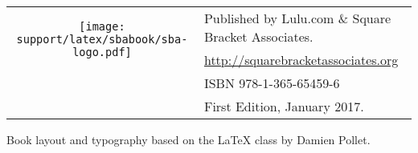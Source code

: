 \documentclass[10pt,twoside,english]{support/latex/sbabook/sbabook}
\begin{document}
{  \vfill

  \begin{tabular}{@{}c@{\quad}l}
    \multirow{2}{*}{\texttt{[image: support/latex/sbabook/sba-logo.pdf]}}
    & Published by Lulu.com \& Square Bracket Associates. \\
    & \url{http://squarebracketassociates.org} \\[\smallskipamount]
    & ISBN 978-1-365-65459-6 \\
    & First Edition, January 2017.
  \end{tabular}
  \medskip

  Book layout and typography based on the  \LaTeX{} class by Damien Pollet.
}


\frontmatter
\pagestyle{plain}


%

\tableofcontents

\mainmatter



















\backmatter

\end{document}
